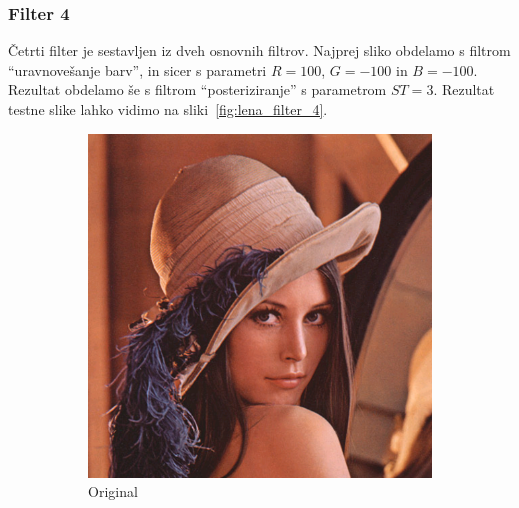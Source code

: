 \documentclass[a4paper, 12pt]{book}
\begin{document}
\subsubsection*{Filter 4}
Četrti filter je sestavljen iz dveh osnovnih filtrov. Najprej sliko obdelamo s
filtrom ``uravnovešanje barv'', in sicer s parametri $R = 100$, $G = -100$ in
$B = -100$. Rezultat obdelamo še s filtrom ``posteriziranje'' s parametrom
$ST = 3$. Rezultat testne slike lahko vidimo na sliki~\ref{fig:lena_filter_4}.

\begin{figure}[!ht]
    \centering
    \begin{subfigure}[b]{0.4\textwidth}
        \includegraphics[width=\textwidth]{lena}
        \caption{Original}
    \end{subfigure}
    \begin{subfigure}[b]{0.4\textwidth}

\end{subfigure}
\end{figure}
\end{document}
